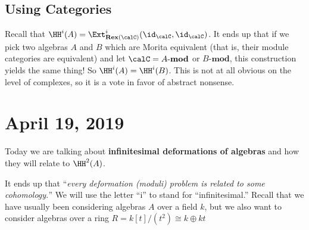 \documentclass[12pt]{article}
\begin{document}
\subsection{Using Categories}
Recall that $\HH^i(A)=\Ext_{\mathbf{Rex(\calC)}}^i(\id_{\calC},\id_\calC)$. It ends up that if we pick two 
algebras $A$ and $B$ which are Morita equivalent (that is, their module categories are equivalent) and let $\calC=A\text{-}\mathbf{mod}$ or $B\text{-}\mathbf{mod}$, this construction
yields the same thing! So $\HH^i(A)=\HH^i(B)$. This is not at all obvious on the level of complexes, 
so it is a vote in favor of abstract nonsense.

\section{April 19, 2019}
Today we are talking about \textbf{infinitesimal deformations of algebras} and how they will relate to $\HH^2(A)$.

It ends up that ``\textit{every deformation (moduli) problem is related to some cohomology.}'' We will use the letter 
``i'' to stand for ``infinitesimal.'' Recall that we have usually been considering algebras $A$ over a field $k$, but
we also want to consider algebras over a ring $R=k[t]/(t^2)\cong k\oplus kt$
\end{document}
